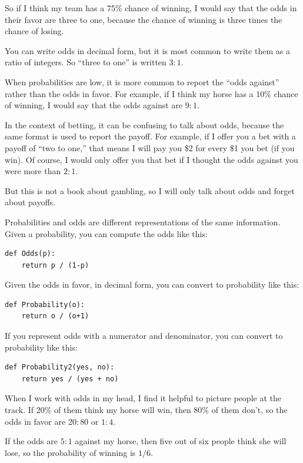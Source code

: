 \documentclass[12pt]{book}
\begin{document}
So if I think my team has a 75\% chance of winning, I would
say that the odds in their favor are three to one, because
the chance of winning is three times the chance of losing.

You can write odds in decimal form, but it is most common to
write them as a ratio of integers.  So ``three to one'' is
written $3:1$.

When probabilities are low, it is more common to report the
``odds against'' rather than the odds in favor.  For
example, if I think my horse has a 10\% chance of winning,
I would say that the odds against are $9:1$.

In the context of betting, it can be confusing to talk about
odds, because the same format is used to report the payoff.
For example, if I offer you a bet with a payoff of ``two to one,''
that means I will pay you \$2 for every \$1 you bet (if
you win).  Of course, I would only offer you that bet if
I thought the odds against you were more than $2:1$.

But this is not a book about gambling, so I will only talk about odds
and forget about payoffs.

Probabilities and odds are different representations of the
same information.  Given a probability, you can compute the
odds like this:

\begin{verbatim}
def Odds(p):
    return p / (1-p)
\end{verbatim}

Given the odds in favor, in decimal form, you can convert to
probability like this:

\begin{verbatim}
def Probability(o):
    return o / (o+1)
\end{verbatim}

If you represent odds with a numerator and denominator, you
can convert to probability like this:

\begin{verbatim}
def Probability2(yes, no):
    return yes / (yes + no)
\end{verbatim}

When I work with odds in my head, I find it helpful to picture
people at the track.  If 20\% of them think my horse will win,
then 80\% of them don't, so the odds in favor are $20:80$ or
$1:4$.

If the odds are $5:1$ against my horse, then five out of six
people think she will lose, so the probability of winning
is $1/6$.
\end{document}
